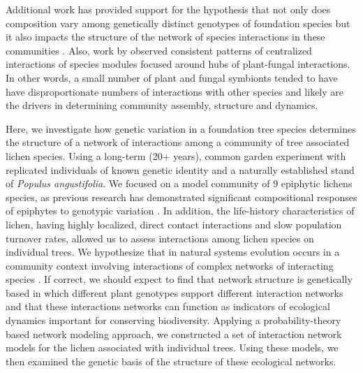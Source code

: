 \documentclass[9pt,twocolumn,twoside,lineno]{pnas-new}
\begin{document}
Additional work has provided support for the hypothesis that not only
does composition vary among genetically distinct genotypes of
foundation species but it also impacts the structure of the network of
species interactions in these communities \cite{Keith2017,
  Lau2015a}. Also, work by \citep{Toju2017, Toju2016, Toju2014a}
observed consistent patterns of centralized interactions of species
modules focused around hubs of plant-fungal interactions. In other
words, a small number of plant and fungal symbionts tended to have
have disproportionate numbers of interactions with other species and
likely are the drivers in determining community assembly, structure
and dynamics.


Here, we investigate how genetic variation in a foundation tree
species determines the structure of a network of interactions among a
community of tree associated lichen species. Using a long-term (20+
years), common garden experiment with replicated individuals of known
genetic identity and a naturally established stand of \textit{Populus
  angustifolia}. We focused on a model community of 9 epiphytic
lichens species, as previous research has demonstrated significant
compositional responses of epiphytes to genotypic variation
\cite{Winfree2011, Zytynska2011}. In addition, the life-history
characteristics of lichen, having highly localized, direct contact
interactions and slow population turnover rates, allowed us to assess
interactions among lichen species on individual trees. We hypothesize
that in natural systems evolution occurs in a community context
involving interactions of complex networks of interacting species
\cite{Lau2015a, Keith2017, Thompson2013, Bascompte2006}.  If correct,
we should expect to find that network structure is genetically based
in which different plant genotypes support different interaction
networks and that these interactions networks can function as
indicators of ecological dynamics important for conserving
biodiversity.  Applying a probability-theory based network modeling
approach, we constructed a set of interaction network models for the
lichen associated with individual trees. Using these models, we then
examined the genetic basis of the structure of these ecological
networks.
\end{document}
